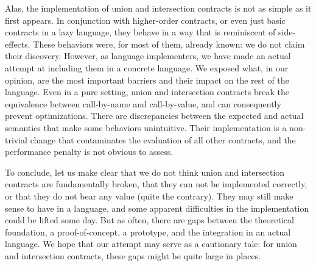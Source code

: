 \documentclass[sigplan,10pt,review,anonymous]{acmart}
\begin{document}
Alas, the implementation of union and intersection contracts is not as simple as
it first appears. In conjunction with higher-order contracts, or even just basic
contracts in a lazy language, they behave in a way that is reminiscent of
side-effects. These behaviors were, for most of them, already known: we do not
claim their discovery. However, as language implementers, we have made an actual
attempt at including them in a concrete language. We exposed what, in our
opinion, are the most important barriers and their impact on the rest of the
language. Even in a pure setting, union and intersection contracts break the
equivalence between call-by-name and call-by-value, and can consequently prevent
optimizations. There are discrepancies between the expected and actual semantics
that make some behaviors unintuitive. Their implementation is a non-trivial
change that contaminates the evaluation of all other contracts, and the
performance penalty is not obvious to assess.

To conclude, let us make clear that we do not think union and intersection
contracts are fundamentally broken, that they can not be implemented correctly,
or that they do not bear any value (quite the contrary). They may still make
sense to have in a language, and some apparent difficulties in the
implementation could be lifted some day. But as often, there are gaps between
the theoretical foundation, a proof-of-concept, a prototype, and the integration
in an actual language. We hope that our attempt may serve as a cautionary tale:
for union and intersection contracts, these gaps might be quite large in places.


\end{document}
